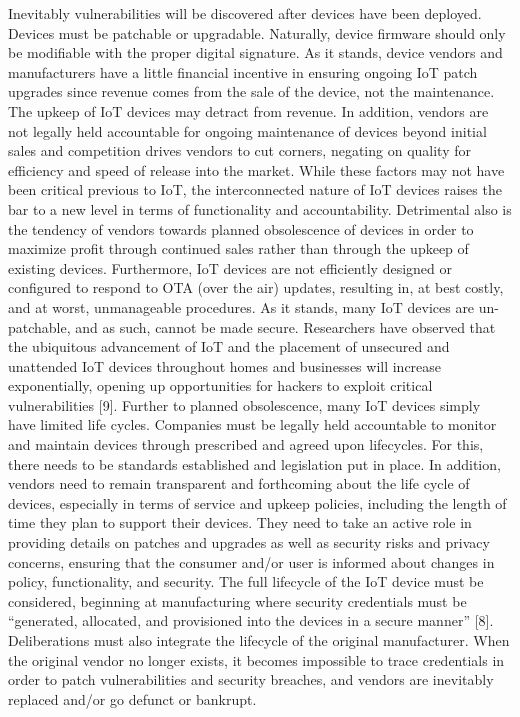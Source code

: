 \documentclass[12pt]{report}
\begin{document}
Inevitably vulnerabilities will be discovered after devices have been deployed. 
Devices must be patchable or upgradable. Naturally, device firmware should only 
be modifiable with the proper digital signature. As it stands, device vendors and 
manufacturers have a little financial incentive in ensuring ongoing IoT patch 
upgrades since revenue comes from the sale of the device, not the maintenance. 
The upkeep of IoT devices may detract from revenue. In addition, vendors are not 
legally held accountable for ongoing maintenance of devices beyond initial sales 
and competition drives vendors to cut corners, negating on quality for efficiency 
and speed of release into the market. While these factors may not have been critical 
previous to IoT, the interconnected nature of IoT devices raises the bar to a new 
level in terms of functionality and accountability. Detrimental also is the 
tendency of vendors towards planned obsolescence of devices in order to maximize 
profit through continued sales rather than through the upkeep of existing devices. 
Furthermore, IoT devices are not efficiently designed or configured to respond to 
OTA (over the air) updates, resulting in, at best costly, and at worst, unmanageable 
procedures. As it stands, many IoT devices are un-patchable, and as such, cannot 
be made secure. Researchers have observed that the ubiquitous advancement of IoT 
and the placement of unsecured and unattended IoT devices throughout homes and 
businesses will increase exponentially, opening up opportunities for hackers 
to exploit critical vulnerabilities [9]. Further to planned obsolescence, many 
IoT devices simply have limited life cycles. Companies must be legally held 
accountable to monitor and maintain devices through prescribed and agreed 
upon lifecycles. For this, there needs to be standards established and 
legislation put in place. In addition, vendors need to remain transparent 
and forthcoming about the life cycle of devices, especially in terms of service 
and upkeep policies, including the length of time they plan to support their devices. 
They need to take an active role in providing details on patches and upgrades as well 
as security risks and privacy concerns, ensuring that the consumer and/or user is 
informed about changes in policy, functionality, and security. 
The full lifecycle of the IoT device must be considered, beginning at manufacturing 
where security credentials must be “generated, allocated, and provisioned into 
the devices in a secure manner” [8]. Deliberations must also integrate the 
lifecycle of the original manufacturer. When the original vendor no longer exists, 
it becomes impossible to trace credentials in order to patch vulnerabilities and 
security breaches, and vendors are inevitably replaced and/or go defunct or bankrupt.
\end{document}
